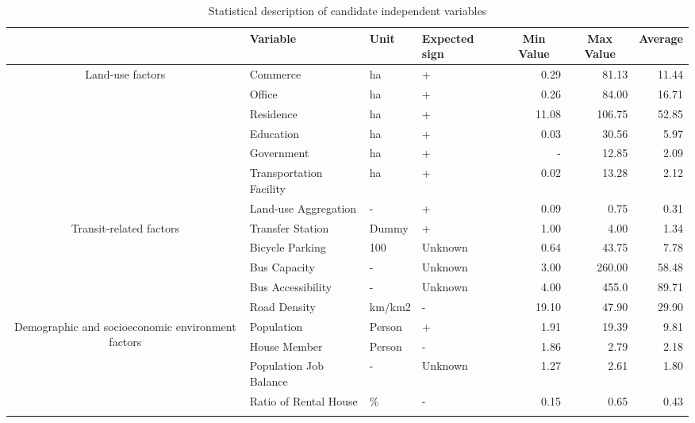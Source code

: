 \begin{sidewaystable}[htbp] %
	\centering
	\caption{Statistical description of candidate independent variables}
	\label{tab:chp4:StatisticalDescription} %
	\small
	\renewcommand{\arraystretch}{1.25} %
	
	\begin{tabular}{clllrrr}
		\Xhline{1.5pt}
		
		\multicolumn{1}{c}{Category} & %
		\multicolumn{1}{l}{Variable} &
		\multicolumn{1}{l}{Unit} &
		\multicolumn{1}{l}{Expected sign} &
		\multicolumn{1}{c}{Min Value} &	
		\multicolumn{1}{c}{Max Value} &	
		\multicolumn{1}{c}{Average}\\
		\midrule
		
		\multirow{7}{90pt}{\centering Land-use factors} %
		& Commerce & ha & + & 0.29 & 81.13 & 11.44 \\
		& Office & ha & + & 0.26  & 84.00 & 16.71 \\
		& Residence & ha & + & 11.08 & 106.75 & 52.85 \\
		& Education & ha & + & 0.03 & 30.56 & 5.97 \\
		& Government & ha & + & - & 12.85 & 2.09 \\
		& Transportation Facility & ha & + & 0.02 & 13.28 & 2.12 \\
		& Land-use Aggregation & - & + & 0.09 & 0.75 & 0.31 \\
		\midrule
		
		\multirow{5}{90pt}{\centering Transit-related factors}
		& Transfer Station & Dummy & + & 1.00 & 4.00 & 1.34 \\
		& Bicycle Parking & 100 & Unknown & 0.64 & 43.75 & 7.78 \\
		& Bus Capacity & - & Unknown & 3.00 & 260.00 & 58.48 \\
		& Bus Accessibility & - & Unknown & 4.00 & 455.0 & 89.71 \\
		& Road Density & km/km2 & - & 19.10 & 47.90 & 29.90 \\
		\midrule
		
		\multirow{4}{90pt}{\centering Demographic and socioeconomic environment factors} 
		& Population & Person & + & 1.91 & 19.39 & 9.81 \\
		& House Member & Person & - & 1.86 & 2.79 & 2.18 \\
		& Population Job Balance & - & Unknown & 1.27 & 2.61 & 1.80 \\
		& Ratio of Rental House & \% & - & 0.15 & 0.65 & 0.43 \\
		\Xhline{1.5pt}
	\end{tabular}
\end{sidewaystable}

